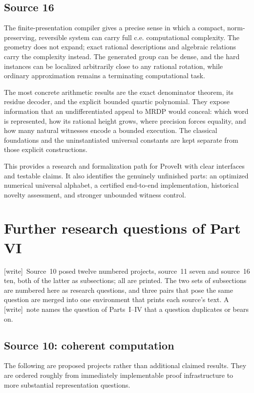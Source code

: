 \documentclass[11pt,letterpaper]{article}
\numberwithin{equation}{section}
\theoremstyle{definition}
\theoremstyle{remark}
\newcommand{\wtag}{\textup{[write]}}
\begin{document}
\subsection{Source 16}
The finite-presentation compiler gives a precise sense in which a compact,
norm-preserving, reversible system can carry full c.e. computational
complexity. The geometry does not expand; exact rational descriptions and
algebraic relations carry the complexity instead. The generated group
can be dense, and the hard instances can be localized arbitrarily close
to any rational rotation, while ordinary approximation remains a
terminating computational task.

The most concrete arithmetic results are the exact denominator theorem,
its residue decoder, and the explicit bounded quartic polynomial.
They expose information that an undifferentiated appeal to MRDP would
conceal: which word is represented, how its rational height grows,
where precision forces equality, and how many natural witnesses encode
a bounded execution. The classical foundations and the uninstantiated
universal constants are kept separate from those explicit constructions.

This provides a research and formalization path for ProveIt with clear
interfaces and testable claims. It also identifies the genuinely
unfinished parts: an optimized numerical universal alphabet, a certified
end-to-end implementation, historical novelty assessment, and stronger
unbounded witness control.

\section{Further research questions of Part VI}
\label{pqc:conv:b62-VI:questions}
\wtag\ Source~10 posed twelve numbered projects, source~11 seven and source~16
ten, both of the latter as subsections; all are printed. The two sets of
subsections are numbered here as research questions, and three pairs that pose
the same question are merged into one environment that prints each source's
text. A \wtag\ note names the question of Parts~I--IV that a question duplicates
or bears on.

\subsection{Source 10: coherent computation}
\label{pqc:cc:sec:research}

The following are proposed projects rather than additional claimed results.
They are ordered roughly from immediately implementable proof infrastructure
to more substantial representation questions.
\end{document}
